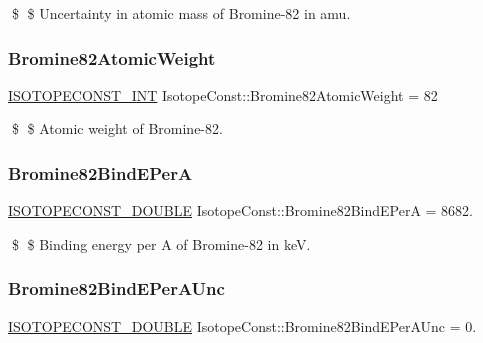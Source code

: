 \$ \$ Uncertainty in atomic mass of Bromine-\/82 in amu. \mbox{\label{group___isotope_const-_bromine-_br82_ga8a793f1f0b5d45f9707a9fa09745da64}} 
\subsubsection{\texorpdfstring{Bromine82\+Atomic\+Weight}{Bromine82AtomicWeight}}
{\footnotesize\ttfamily \mbox{\hyperlink{group___isotope_const-_macros_ga5f18360b3e99483a35c32d789e62621c}{I\+S\+O\+T\+O\+P\+E\+C\+O\+N\+S\+T\+\_\+\+I\+NT}} Isotope\+Const\+::\+Bromine82\+Atomic\+Weight = 82}

\$ \$ Atomic weight of Bromine-\/82. \mbox{\label{group___isotope_const-_bromine-_br82_ga0ea8498d7ef48b03ac16900567f88f12}} 
\subsubsection{\texorpdfstring{Bromine82\+Bind\+E\+PerA}{Bromine82BindEPerA}}
{\footnotesize\ttfamily \mbox{\hyperlink{group___isotope_const-_macros_ga8f45a7272ce02c0b4c65c44636ed719a}{I\+S\+O\+T\+O\+P\+E\+C\+O\+N\+S\+T\+\_\+\+D\+O\+U\+B\+LE}} Isotope\+Const\+::\+Bromine82\+Bind\+E\+PerA = 8682.}

\$ \$ Binding energy per A of Bromine-\/82 in keV. \mbox{\label{group___isotope_const-_bromine-_br82_gaaf989be11100b1a95c0ea29faf33fc75}} 
\subsubsection{\texorpdfstring{Bromine82\+Bind\+E\+Per\+A\+Unc}{Bromine82BindEPerAUnc}}
{\footnotesize\ttfamily \mbox{\hyperlink{group___isotope_const-_macros_ga8f45a7272ce02c0b4c65c44636ed719a}{I\+S\+O\+T\+O\+P\+E\+C\+O\+N\+S\+T\+\_\+\+D\+O\+U\+B\+LE}} Isotope\+Const\+::\+Bromine82\+Bind\+E\+Per\+A\+Unc = 0.}

